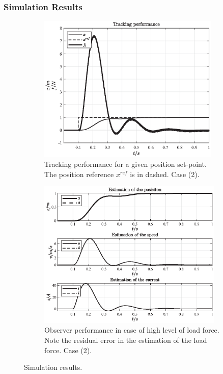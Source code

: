 \documentclass[11pt,a4paper,oneside]{book}
\numberwithin{equation}{section}
\theoremstyle{it}
\theoremstyle{definition}
\begin{document}
\subsubsection{Simulation Results}
\begin{figure}[H]
	\centering
	\begin{subfigure}{.5\textwidth}
		\centering
		\includegraphics[width = 245pt, angle = 0, 
		keepaspectratio]{figures/moving_coil/track_x_3.eps}
		\captionsetup{width=0.75\textwidth}
		\caption{Tracking performance for a given position set-point. The 
			position reference $x^{ref}$ is in dashed. Case (2).}
		\label{figure_moving_coil_2}
	\end{subfigure}%
	\begin{subfigure}{.5\textwidth}
		\centering
		\includegraphics[width = 250pt, angle = 0, 
		keepaspectratio]{figures/moving_coil/observer_3.eps}
		\captionsetup{width=0.75\textwidth}
		\caption{Observer performance in case of high level of load force. Note 
			the residual error in the estimation of the load force. Case (2).}
		\label{figure_moving_coil_3}
	\end{subfigure}
	\caption{Simulation results.}
	\label{}
\end{figure}
\end{document}
